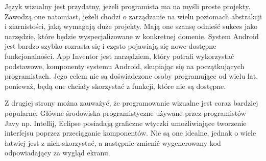 Język wizualny jest przydatny, jeżeli programista ma na myśli proste projekty. Zawodzą one natomiast, jeżeli chodzi o zarządzanie na wielu poziomach abstrakcji i ziarnistości, jaką wymagają duże projekty. Mają one szansę odnieść sukces jako narzędzie, które będzie wyspecjalizowane w konkretnej domenie. System Android jest bardzo szybko rozrasta się i często pojawiają się nowe dostępne funkcjonalności. App Inventor jest narzędziem, który potrafi wykorzystać podstawowe, komponenty systemu Android, skupiając się na początkujących programistach. Jego celem nie są doświadczone osoby programujące od wielu lat, ponieważ, będą one chciały skorzystać z funkcji, które nie są dostępne.

Z drugiej strony można zauważyć, że programowanie wizualne jest coraz bardziej popularne. Główne środowiska programistyczne używane przez programistów Javy np. Intellij, Eclipse posiadają graficzne wtyczki umożliwiające tworzenie interfejsu poprzez przeciąganie komponentów. Nie są one idealne, jednak o wiele łatwiej jest z nich skorzystać, a następnie zmienić wygenerowany kod odpowiadający za wygląd ekranu.





